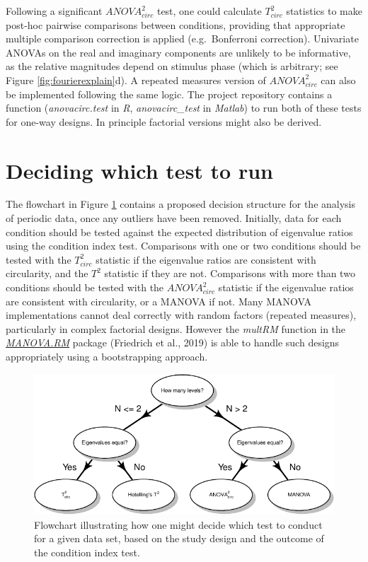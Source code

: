 \documentclass[]{article}
\begin{document}
Following a significant \({ANOVA}^2_{circ}\) test, one could calculate \(T^2_{circ}\) statistics to make post-hoc pairwise comparisons between conditions, providing that appropriate multiple comparison correction is applied (e.g.~Bonferroni correction). Univariate ANOVAs on the real and imaginary components are unlikely to be informative, as the relative magnitudes depend on stimulus phase (which is arbitrary; see Figure \ref{fig:fourierexplain}d). A repeated measures version of \({ANOVA}^2_{circ}\) can also be implemented following the same logic. The project repository contains a function (\emph{anovacirc.test} in \emph{R}, \emph{anovacirc\_test} in \emph{Matlab}) to run both of these tests for one-way designs. In principle factorial versions might also be derived.

\hypertarget{deciding-which-test-to-run}{%
\section{Deciding which test to run}\label{deciding-which-test-to-run}}

The flowchart in Figure \ref{fig:flowchart} contains a proposed decision structure for the analysis of periodic data, once any outliers have been removed. Initially, data for each condition should be tested against the expected distribution of eigenvalue ratios using the condition index test. Comparisons with one or two conditions should be tested with the \(T^2_{circ}\) statistic if the eigenvalue ratios are consistent with circularity, and the \(T^2\) statistic if they are not. Comparisons with more than two conditions should be tested with the \(ANOVA^2_{circ}\) statistic if the eigenvalue ratios are consistent with circularity, or a MANOVA if not. Many MANOVA implementations cannot deal correctly with random factors (repeated measures), particularly in complex factorial designs. However the \emph{multRM} function in the \href{https://CRAN.R-project.org/package=MANOVA.RM}{\emph{MANOVA.RM}} package (Friedrich et al., 2019) is able to handle such designs appropriately using a bootstrapping approach.

\begin{figure}

{\centering \includegraphics{manuscript_files/figure-latex/flowchart-1} 

}

\caption{Flowchart illustrating how one might decide which test to conduct for a given data set, based on the study design and the outcome of the condition index test.}\label{fig:flowchart}
\end{figure}
\end{document}
